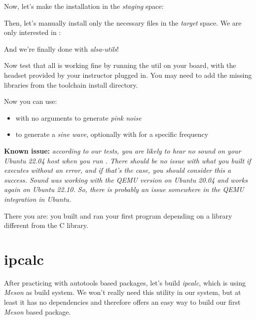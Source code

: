 Now, let's make the installation in the {\em staging} space:


Then, let's manually install only the necessary files in the {\em target}
space. We are only interested in :


And we're finally done with {\em alsa-utils}!

Now test that all is working fine by running the  util on
your board, with the headset provided by your instructor plugged
in. You may need to add the missing libraries from the toolchain
install directory.

Now you can use:

\begin{itemize}

\item {} with no arguments to generate {\em pink noise}

\item {} to generate a {\em sine wave},
optionally with  for a specific frequency

\end{itemize}

{\bf Known issue:} {\em according to our tests, you are likely to hear no
sound on your Ubuntu 22.04 host when you run . There should be no
issue with what you built if  executes without an
error, and if that's the case, you should consider this a success.
Sound was working with the QEMU version on Ubuntu 20.04 and works
again on Ubuntu 22.10. So, there is probably an issue somewhere in the QEMU
integration in Ubuntu.}

There you are: you built and ran your first program depending
on a library different from the C library.

\section{ipcalc}

After practicing with autotools based packages, let's build {\em ipcalc}, which
is using {\em Meson} as build system. We won't really need this utility
in our system, but at least it has no dependencies and therefore
offers an easy way to build our first {\em Meson} based package.

